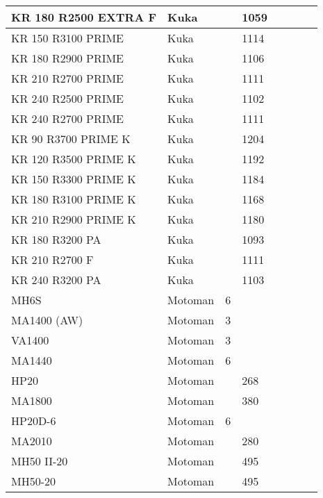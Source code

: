 \begin{longtable}{|p{}|p{}|p{}|p{}|p{}|p{}|p{}|p{}|}
KR 180 R2500 EXTRA F & Kuka &  & \cellcolor{red} 1059 &  &  &  &  \\ \hline
KR 150 R3100 PRIME & Kuka &  & \cellcolor{red} 1114 &  &  &  &  \\ \hline
KR 180 R2900 PRIME  & Kuka &  & \cellcolor{red} 1106 &  &  &  &  \\ \hline
KR 210 R2700 PRIME & Kuka &  & \cellcolor{red} 1111 &  &  &  &  \\ \hline
KR 240 R2500 PRIME  & Kuka &  & \cellcolor{red} 1102 &  &  &  &  \\ \hline
KR 240 R2700 PRIME  & Kuka &  & \cellcolor{red} 1111 &  &  &  &  \\ \hline
KR 90 R3700 PRIME K & Kuka &  & \cellcolor{red} 1204 &  &  &  &  \\ \hline
KR 120 R3500 PRIME K & Kuka &  & \cellcolor{red} 1192 &  &  &  &  \\ \hline
KR 150 R3300 PRIME K & Kuka &  & \cellcolor{red} 1184 &  &  &  &  \\ \hline
KR 180 R3100 PRIME K & Kuka &  & \cellcolor{red} 1168 &  &  &  &  \\ \hline
KR 210 R2900 PRIME K & Kuka &  & \cellcolor{red} 1180 &  &  &  &  \\ \hline
KR 180 R3200 PA & Kuka &  & \cellcolor{red} 1093 &  &  &  &  \\ \hline
KR 210 R2700 F & Kuka &  & \cellcolor{red} 1111 &  &  &  &  \\ \hline
KR 240 R3200 PA & Kuka &  & \cellcolor{red} 1103 &  &  &  &  \\ \hline
MH6S & Motoman & \cellcolor{red} 6 &  &  &  &  &  \\ \hline
MA1400 (AW) & Motoman & \cellcolor{red} 3 &  &  &  &  &  \\ \hline
VA1400 & Motoman & \cellcolor{red} 3 &  &  &  &  &  \\ \hline
MA1440 & Motoman & \cellcolor{red} 6 &  &  &  &  &  \\ \hline
HP20 & Motoman &  & \cellcolor{red} 268 &  &  &  &  \\ \hline
MA1800 & Motoman &  & \cellcolor{red} 380 &  &  &  &  \\ \hline
HP20D-6 & Motoman & \cellcolor{red} 6 &  &  &  &  &  \\ \hline
MA2010 & Motoman &  & \cellcolor{red} 280 &  &  &  &  \\ \hline
MH50 II-20 & Motoman &  & \cellcolor{red} 495 &  &  &  &  \\ \hline
MH50-20 & Motoman &  & \cellcolor{red} 495 &  &  &  &  \\ \hline

\end{longtable}
